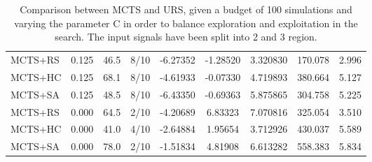 \documentclass[11pt]{article}
\begin{document}
\begin{table}[ht]
\begin{tabular}{|l|l|c|c|c|c|c|c|c|}
MCTS+RS                                     & 0.125              &  46.5                   & 8/10                          & -6.27352  & -1.28520 & 3.320830 &  170.078 &  2.996    \\
MCTS+HC                                     & 0.125              &  68.1                   & 8/10                          & -4.61933  & -0.07330 & 4.719893 &  380.664 &  5.127    \\
MCTS+SA                                     & 0.125              &  48.5                   & 8/10                          & -6.43350  & -0.69363 & 5.875865 &  304.758 &  5.225    \\ \hline

MCTS+RS                                     & 0.000              &  64.5                   & 2/10                          & -4.20689  & 6.83323  & 7.070816 &  325.054 &  3.510    \\
MCTS+HC                                     & 0.000              &  41.0                   & 4/10                          & -2.64884  & 1.95654  & 3.712926 &  430.037 &  5.589    \\
MCTS+SA                                     & 0.000              &  78.0                   & 2/10                          & -1.51834  & 4.81908  & 6.613282 &  558.383 &  5.834    \\ \hline
\end{tabular}
\caption{Comparison between MCTS and URS, given a budget of 100 simulations and varying the parameter C in order to balance exploration and exploitation in the search. The input signals have been split into 2 and 3 region.}~\label{table:res:s1}
\end{table}
\end{document}
